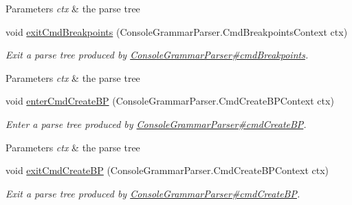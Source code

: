 \begin{DoxyCompactItemize}
\begin{DoxyCompactList}
\begin{DoxyParams}{Parameters}
{\em ctx} & the parse tree\\
\hline
\end{DoxyParams}
 \end{DoxyCompactList}\item 
void \hyperlink{classgov_1_1nasa_1_1jpf_1_1inspector_1_1client_1_1parser_1_1_console_grammar_base_listener_a345a6bf33f91739a54948e74c755b78c}{exit\+Cmd\+Breakpoints} (Console\+Grammar\+Parser.\+Cmd\+Breakpoints\+Context ctx)
\begin{DoxyCompactList}\small\item\em Exit a parse tree produced by \hyperlink{classgov_1_1nasa_1_1jpf_1_1inspector_1_1client_1_1parser_1_1_console_grammar_parser_a05e7399334460971133b1effabd14883}{Console\+Grammar\+Parser\#cmd\+Breakpoints}.


\begin{DoxyParams}{Parameters}
{\em ctx} & the parse tree\\
\hline
\end{DoxyParams}
 \end{DoxyCompactList}\item 
void \hyperlink{classgov_1_1nasa_1_1jpf_1_1inspector_1_1client_1_1parser_1_1_console_grammar_base_listener_a90705a3e5e2b3aa9fccfd9347e460272}{enter\+Cmd\+Create\+BP} (Console\+Grammar\+Parser.\+Cmd\+Create\+B\+P\+Context ctx)
\begin{DoxyCompactList}\small\item\em Enter a parse tree produced by \hyperlink{classgov_1_1nasa_1_1jpf_1_1inspector_1_1client_1_1parser_1_1_console_grammar_parser_abe17248e2be8d9035749fc570f460e1b}{Console\+Grammar\+Parser\#cmd\+Create\+BP}.


\begin{DoxyParams}{Parameters}
{\em ctx} & the parse tree\\
\hline
\end{DoxyParams}
 \end{DoxyCompactList}\item 
void \hyperlink{classgov_1_1nasa_1_1jpf_1_1inspector_1_1client_1_1parser_1_1_console_grammar_base_listener_ad6e7c74816c3970954b0e8a053b7aa91}{exit\+Cmd\+Create\+BP} (Console\+Grammar\+Parser.\+Cmd\+Create\+B\+P\+Context ctx)
\begin{DoxyCompactList}\small\item\em Exit a parse tree produced by \hyperlink{classgov_1_1nasa_1_1jpf_1_1inspector_1_1client_1_1parser_1_1_console_grammar_parser_abe17248e2be8d9035749fc570f460e1b}{Console\+Grammar\+Parser\#cmd\+Create\+BP}.



\end{DoxyCompactList}
\end{DoxyCompactItemize}
